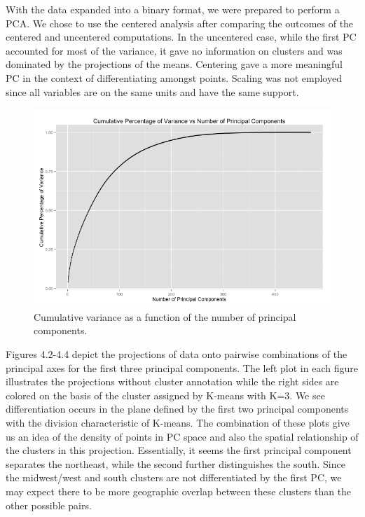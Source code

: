 \documentclass[english]{article}\usepackage{graphicx, color}
\numberwithin{equation}{section}
\numberwithin{figure}{section}
\begin{document}
With the data expanded into a binary format, we were prepared to perform a PCA. We chose to use the centered analysis after comparing the outcomes of the centered and uncentered computations. In the uncentered case, while the first PC accounted for most of the variance, it gave no information on clusters and was dominated by the projections of the means. Centering gave a more meaningful PC in the context of differentiating amongst points. Scaling was not employed since all variables are on the same units and have the same support. 

\begin{figure}
\begin{center}
\includegraphics[scale=.3]{cumulativevariance.png}
\end{center}
\caption{Cumulative variance as a function of the number of principal components.}
\end{figure}

Figures 4.2-4.4 depict the projections of data onto pairwise combinations of the principal axes for the first three principal components. The left plot in each figure illustrates the projections without cluster annotation while the right sides are colored on the basis of the cluster assigned by K-means with K=3. We see differentiation occurs in the plane defined by the first two principal components with the division characteristic of K-means. The combination of these plots give us an idea of the density of points in PC space and also the spatial relationship of the clusters in this projection. Essentially, it seems the first principal component separates the northeast, while the second further distinguishes the south. Since the midwest/west and south clusters are not differentiated by the first PC, we may expect there to be more geographic overlap between these clusters than the other possible pairs. 
\end{document}
